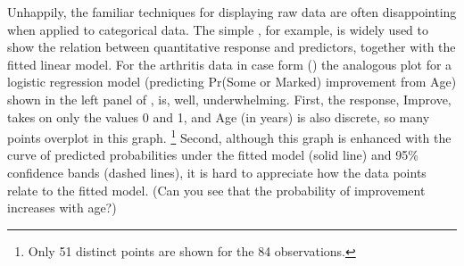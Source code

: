 Unhappily, the familiar techniques for displaying raw data are
often disappointing when applied to categorical data.
The simple \scat, for example, is widely used to show
the relation between
quantitative response and predictors, together with the fitted linear
model.
For the arthritis data in case form ()
the analogous plot for a logistic regression model
(predicting Pr(Some or Marked) improvement from Age) shown in the
left panel of , is, well,  underwhelming.
First, the response, Improve, takes on only the values 0 and 1,
and Age (in years) is also discrete, so many points overplot
in this graph.%
\footnote{Only 51 distinct points are shown for the 84 observations.}
Second, although this graph is enhanced with the curve of predicted
probabilities under the fitted model (solid line) and 95\% confidence
bands (dashed lines), it is hard to appreciate how the data points
relate to the fitted model.  (Can you see that the probability of
improvement increases with age?)

